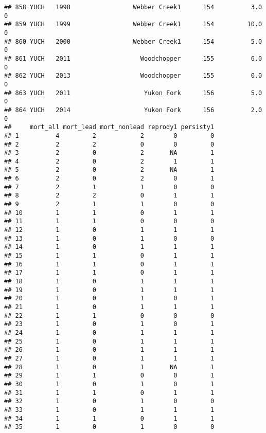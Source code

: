 \documentclass[
]{article}
\begin{document}
\begin{verbatim}
## 858 YUCH   1998                 Webber Creek1      154          3.0       0
## 859 YUCH   1999                 Webber Creek1      154         10.0       0
## 860 YUCH   2000                 Webber Creek1      154          5.0       0
## 861 YUCH   2011                   Woodchopper      155          6.0       0
## 862 YUCH   2013                   Woodchopper      155          0.0       0
## 863 YUCH   2011                    Yukon Fork      156          5.0       0
## 864 YUCH   2014                    Yukon Fork      156          2.0       0
##     mort_all mort_lead mort_nonlead reprody1 persisty1
## 1          4         2            2        0         0
## 2          2         2            0        0         0
## 3          2         0            2       NA         1
## 4          2         0            2        1         1
## 5          2         0            2       NA         1
## 6          2         0            2        0         1
## 7          2         1            1        0         0
## 8          2         2            0        1         1
## 9          2         1            1        0         0
## 10         1         1            0        1         1
## 11         1         1            0        0         0
## 12         1         0            1        1         1
## 13         1         0            1        0         0
## 14         1         0            1        1         1
## 15         1         1            0        1         1
## 16         1         1            0        1         1
## 17         1         1            0        1         1
## 18         1         0            1        1         1
## 19         1         0            1        1         1
## 20         1         0            1        0         1
## 21         1         0            1        1         1
## 22         1         1            0        0         0
## 23         1         0            1        0         1
## 24         1         0            1        1         1
## 25         1         0            1        1         1
## 26         1         0            1        1         1
## 27         1         0            1        1         1
## 28         1         0            1       NA         1
## 29         1         1            0        0         1
## 30         1         0            1        0         1
## 31         1         1            0        1         1
## 32         1         0            1        0         0
## 33         1         0            1        1         1
## 34         1         1            0        1         1
## 35         1         0            1        0         0

\end{verbatim}
\end{document}
